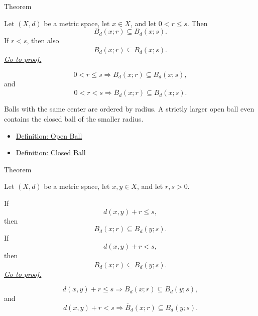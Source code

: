\begin{theorembox}{Theorem}
\begin{theorem}\label{thm:metric-ball-nesting}
Let \((X,d)\) be a metric space, let \(x\in X\), and let \(0<r\leq s\).
Then
\[
  B_d(x;r)\subseteq B_d(x;s).
\]
If \(r<s\), then also
\[
  \overline{B}_d(x;r)\subseteq B_d(x;s).
\]
\hyperref[prf:metric-ball-nesting]{\textit{Go to proof.}}
\end{theorem}
\end{theorembox}

\begin{remark*}
\[
0<r\leq s
\Longrightarrow
B_d(x;r)\subseteq B_d(x;s),
\]
and
\[
0<r<s
\Longrightarrow
\overline{B}_d(x;r)\subseteq B_d(x;s).
\]
\end{remark*}

\begin{remark*}[Interpretation]
Balls with the same center are ordered by radius.  A strictly larger open
ball even contains the closed ball of the smaller radius.
\end{remark*}

\begin{dependencies}
\begin{itemize}
  \item \hyperref[def:metric-open-ball]{Definition: Open Ball}
  \item \hyperref[def:metric-closed-ball]{Definition: Closed Ball}
\end{itemize}
\end{dependencies}

\begin{theorembox}{Theorem}
\begin{theorem}
\label{thm:metric-ball-containment-by-center-distance}
Let \((X,d)\) be a metric space, let \(x,y\in X\), and let \(r,s>0\).

If
\[
  d(x,y)+r\leq s,
\]
then
\[
  B_d(x;r)\subseteq B_d(y;s).
\]
If
\[
  d(x,y)+r<s,
\]
then
\[
  \overline{B}_d(x;r)\subseteq B_d(y;s).
\]
\hyperref[prf:metric-ball-containment-by-center-distance]{\textit{Go to proof.}}
\end{theorem}
\end{theorembox}

\begin{remark*}
\[
d(x,y)
+r\leq s
\Longrightarrow
B_d(x;r)\subseteq B_d(y;s),
\]
and
\[
d(x,y)+r<s
\Longrightarrow
\overline{B}_d(x;r)\subseteq B_d(y;s).
\]
\end{remark*}

